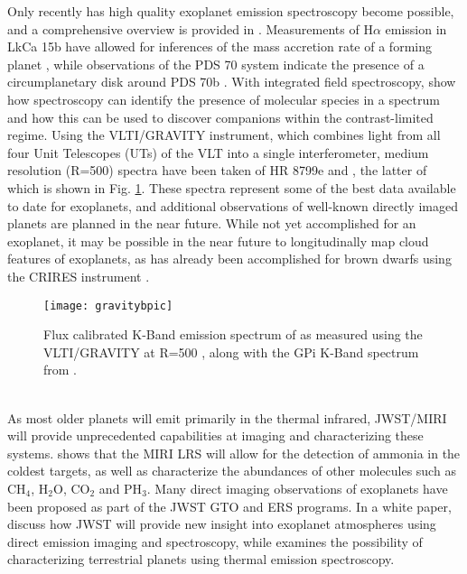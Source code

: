 Only recently has high quality exoplanet emission spectroscopy become possible, and a comprehensive overview is provided in \parencite{Biller2018}.
Measurements of H$\alpha$ emission in LkCa 15b have allowed for inferences of the mass accretion rate of a forming planet \parencite{Sallum2015}, while observations of the PDS 70 system indicate the presence of a circumplanetary disk around PDS 70b \parencite{Keppler2018,Christiaens2019}.
With integrated field spectroscopy, \parencite{Hoeijmakers2018} show how spectroscopy can identify the presence of molecular species in a spectrum and how this can be used to discover companions within the contrast-limited regime.
Using the VLTI/GRAVITY instrument, which combines light from all four Unit Telescopes (UTs) of the VLT into a single interferometer, medium resolution (R=500) spectra have been taken of HR 8799e \parencite{Lacour2019} and \bpic \parencite{GRAVITYCollaboration2019}, the latter of which is shown in Fig. \ref{fig:gravitybpic}. 
These spectra represent some of the best data available to date for exoplanets, and additional observations of well-known directly imaged planets are planned in the near future.
While not yet accomplished for an exoplanet, it may be possible in the near future to longitudinally map cloud features of exoplanets, as has already been accomplished for brown dwarfs using the CRIRES instrument \parencite{Crossfield2014}.
\begin{figure}[t]
	\texttt{[image: gravitybpic]}
	\caption{Flux calibrated K-Band emission spectrum of \bpic as measured using the VLTI/GRAVITY at R=500 \parencite{GRAVITYCollaboration2019}, along with the GPi K-Band spectrum from \parencite{Chilcote2017}.}
	\label{fig:gravitybpic}
\end{figure}\\

As most older planets will emit primarily in the thermal infrared, JWST/MIRI will provide unprecedented capabilities at imaging and characterizing these systems.
\parencite{Danielski2018} shows that the MIRI LRS will allow for the detection of ammonia in the coldest targets, as well as characterize the abundances of other molecules such as CH$_{4}$, H$_{2}$O, CO$_{2}$ and PH$_{3}$.
Many direct imaging observations of exoplanets have been proposed as part of the JWST GTO and ERS programs. In a white paper, \parencite{Beichman2019} discuss how JWST will provide new insight into exoplanet atmospheres using direct emission imaging and spectroscopy, while \parencite{Line2019} examines the possibility of characterizing terrestrial planets using thermal emission spectroscopy. 

